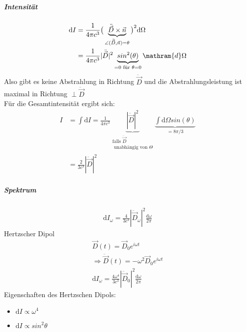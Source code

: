 \documentclass[a4paper]{article}
\newcommand{\intd}{\int\!\mathrm{d}}
\begin{document}
\subparagraph{Intensität}
\begin{align}
\mathrm{d}I&=\frac{1}{4\pi c^3}\big( \underbrace{\ddot{\vec{D}}\times\vec{n}
}_{\angle(\ddot{\vec{D}},\vec{n})=\theta}\big)^2\mathrm{d}\Omega\\
&=\frac{1}{4\pi c^3}|\ddot{\vec{D}}|^2
\underbrace{sin^2(\theta)}_{=0 \text{ f\"ur }\theta=0}\mathram{d}\Omega\\
\end{align}
Also gibt es keine Abstrahlung in Richtung $\ddot{\vec{D}}$ und die
Abstrahlungsleistung ist maximal in Richtung $\perp \ddot{\vec{D}}$\\
Für die Gesamtintensität ergibt sich:
\begin{align}
I&=\intd I=\frac{1}{4\pi
c^3}\underbrace{|\ddot{\vec{D}}|^2}_{\substack{\text{falls } \ddot{\vec{D}}\\
\text{ unabhängig von }\Theta}} \underbrace{\intd \Omega
sin(\theta)}_{=8\pi/3}\\
&=\frac{2}{3c^3}|\ddot{\vec{D}}|^2
\end{align}
\subparagraph{Spektrum}
\begin{align}
\mathrm{d}I_\omega=\frac{4}{3c^3}|\ddot{\vec{D}}_\omega|^2\frac{\mathrm{d}\omega}{2\pi}
\end{align}
Hertzscher Dipol
\begin{align}
\vec{D}(t)=\vec{D}_0 e^{i\omega t}\\
\Rightarrow \ddot{\vec{D}}(t)=-\omega^2\vec{D}_0 e^{i\omega t}\\
\mathrm{d}I_\omega=\frac{4\omega^4}{3c^3}|\ddot{\vec{D}}_0|^2\frac{\mathrm{d}\omega}{2\pi}
\end{align}
Eigenschaften des Hertzschen Dipols:
\begin{itemize}
  \item $\mathrm{d}I\propto \omega^4$
  \item $\mathrm{d}I\propto sin^2\theta$
\end{itemize}
\end{document}
